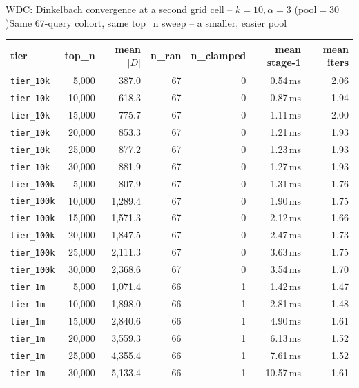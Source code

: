 \documentclass[aspectratio=169,10pt]{beamer}
\begin{document}
\begin{frame}{WDC: Dinkelbach convergence at a second grid cell -- $k{=}10,\alpha{=}3$ (pool$=30$)}{Same 67-query cohort, same top\_n sweep -- a smaller, easier pool}
\tiny
\begin{center}
\begin{tabular}{lrrrrrr}
\toprule
tier & top\_n & mean $|D|$ & n\_ran & n\_clamped & mean stage-1 & mean iters \\
\midrule
\texttt{tier\_10k} & 5{,}000 & 387.0 & 67 & 0 & 0.54\,ms & 2.06 \\
\texttt{tier\_10k} & 10{,}000 & 618.3 & 67 & 0 & 0.87\,ms & 1.94 \\
\texttt{tier\_10k} & 15{,}000 & 775.7 & 67 & 0 & 1.11\,ms & 2.00 \\
\texttt{tier\_10k} & 20{,}000 & 853.3 & 67 & 0 & 1.21\,ms & 1.93 \\
\texttt{tier\_10k} & 25{,}000 & 877.2 & 67 & 0 & 1.23\,ms & 1.93 \\
\texttt{tier\_10k} & 30{,}000 & 881.9 & 67 & 0 & 1.27\,ms & 1.93 \\
\texttt{tier\_100k} & 5{,}000 & 807.9 & 67 & 0 & 1.31\,ms & 1.76 \\
\texttt{tier\_100k} & 10{,}000 & 1{,}289.4 & 67 & 0 & 1.90\,ms & 1.75 \\
\texttt{tier\_100k} & 15{,}000 & 1{,}571.3 & 67 & 0 & 2.12\,ms & 1.66 \\
\texttt{tier\_100k} & 20{,}000 & 1{,}847.5 & 67 & 0 & 2.47\,ms & 1.73 \\
\texttt{tier\_100k} & 25{,}000 & 2{,}111.3 & 67 & 0 & 3.63\,ms & 1.75 \\
\texttt{tier\_100k} & 30{,}000 & 2{,}368.6 & 67 & 0 & 3.54\,ms & 1.70 \\
\texttt{tier\_1m} & 5{,}000 & 1{,}071.4 & 66 & 1 & 1.42\,ms & 1.47 \\
\texttt{tier\_1m} & 10{,}000 & 1{,}898.0 & 66 & 1 & 2.81\,ms & 1.48 \\
\texttt{tier\_1m} & 15{,}000 & 2{,}840.6 & 66 & 1 & 4.90\,ms & 1.61 \\
\texttt{tier\_1m} & 20{,}000 & 3{,}559.3 & 66 & 1 & 6.13\,ms & 1.52 \\
\texttt{tier\_1m} & 25{,}000 & 4{,}355.4 & 66 & 1 & 7.61\,ms & 1.52 \\
\texttt{tier\_1m} & 30{,}000 & 5{,}133.4 & 66 & 1 & 10.57\,ms & 1.61 \\
\bottomrule
\end{tabular}
\end{center}


\end{frame}
\end{document}
